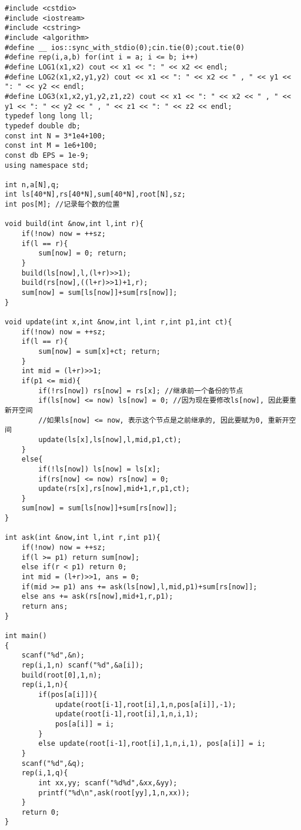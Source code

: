 \documentclass[twoside]{article}
\begin{document}
\begin{lstlisting}
#include <cstdio>
#include <iostream>
#include <cstring>
#include <algorithm>
#define __ ios::sync_with_stdio(0);cin.tie(0);cout.tie(0)
#define rep(i,a,b) for(int i = a; i <= b; i++)
#define LOG1(x1,x2) cout << x1 << ": " << x2 << endl;
#define LOG2(x1,x2,y1,y2) cout << x1 << ": " << x2 << " , " << y1 << ": " << y2 << endl;
#define LOG3(x1,x2,y1,y2,z1,z2) cout << x1 << ": " << x2 << " , " << y1 << ": " << y2 << " , " << z1 << ": " << z2 << endl;
typedef long long ll;
typedef double db;
const int N = 3*1e4+100;
const int M = 1e6+100;
const db EPS = 1e-9;
using namespace std;

int n,a[N],q;
int ls[40*N],rs[40*N],sum[40*N],root[N],sz;
int pos[M]; //记录每个数的位置

void build(int &now,int l,int r){
	if(!now) now = ++sz;
	if(l == r){
		sum[now] = 0; return;
	}
	build(ls[now],l,(l+r)>>1);
	build(rs[now],((l+r)>>1)+1,r);
	sum[now] = sum[ls[now]]+sum[rs[now]];
}

void update(int x,int &now,int l,int r,int p1,int ct){
	if(!now) now = ++sz;
	if(l == r){
		sum[now] = sum[x]+ct; return;
	}
	int mid = (l+r)>>1;
	if(p1 <= mid){
		if(!rs[now]) rs[now] = rs[x]; //继承前一个备份的节点
		if(ls[now] <= now) ls[now] = 0; //因为现在要修改ls[now], 因此要重新开空间
		//如果ls[now] <= now, 表示这个节点是之前继承的, 因此要赋为0, 重新开空间
		update(ls[x],ls[now],l,mid,p1,ct);
	}
	else{
		if(!ls[now]) ls[now] = ls[x];
		if(rs[now] <= now) rs[now] = 0;
		update(rs[x],rs[now],mid+1,r,p1,ct);
	}
	sum[now] = sum[ls[now]]+sum[rs[now]];
}

int ask(int &now,int l,int r,int p1){
	if(!now) now = ++sz;
	if(l >= p1) return sum[now];
	else if(r < p1) return 0;
	int mid = (l+r)>>1, ans = 0;
	if(mid >= p1) ans += ask(ls[now],l,mid,p1)+sum[rs[now]];
	else ans += ask(rs[now],mid+1,r,p1);
	return ans;
}

int main()
{
	scanf("%d",&n);
	rep(i,1,n) scanf("%d",&a[i]);
	build(root[0],1,n);
	rep(i,1,n){
		if(pos[a[i]]){
			update(root[i-1],root[i],1,n,pos[a[i]],-1);
			update(root[i-1],root[i],1,n,i,1);
			pos[a[i]] = i;
		}
		else update(root[i-1],root[i],1,n,i,1), pos[a[i]] = i;
	}
	scanf("%d",&q);
	rep(i,1,q){
		int xx,yy; scanf("%d%d",&xx,&yy);
		printf("%d\n",ask(root[yy],1,n,xx));
	}
	return 0;
}
\end{lstlisting}
\end{document}
